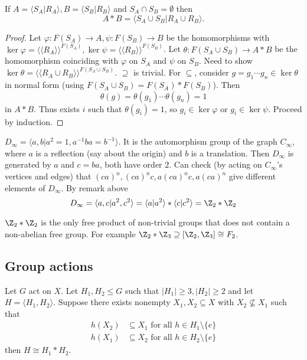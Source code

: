 \documentclass[a4paper]{article}
\begin{document}
\begin{theorem}
  If \(A = \langle S_A|R_A \rangle, B = \langle S_B|R_B \rangle\) and \(S_A \cap S_B = \emptyset\) then
  \[
    A * B = \langle S_A \cup S_B| R_A \cup R_B \rangle.
  \]
\end{theorem}

\begin{proof}
  Let \(\varphi: F(S_A) \to A, \psi: F(S_B) \to B\) be the homomorphisms with \(\ker \varphi = \langle\langle R_A \rangle\rangle^{F(S_A)}, \ker \psi = \langle\langle R_B \rangle\rangle^{F(S_B)}\). Let \(\theta: F(S_A \cup S_B) \to A * B\) be the homomorphism coinciding with \(\varphi\) on \(S_A\) and \(\psi\) on \(S_B\). Need to show \(\ker \theta = \langle\langle R_A \cup R_B \rangle\rangle^{F(S_A \cup S_B)}\). \(\supseteq\) is trivial. For \(\subseteq\), consider \(g = g_1 \cdots g_n \in \ker \theta\) in normal form (using \(F(S_A \cup S_B) = F(S_A) * F(S_B)\)). Then
  \[
    \theta(g) = \theta(g_1) \cdots \theta(g_n) = 1
  \]
  in \(A * B\). Thus exists \(i\) such that \(\theta(g_i) = 1\), so \(g_i \in \ker \varphi\) or \(g_i \in \ker \psi\). Proceed by induction.
\end{proof}

\begin{eg}
  \(D_\infty = \langle a, b| a^2 = 1, a^{-1}ba = b^{-1} \rangle\). It is the automorphism group of the graph \(C_\infty\), where \(a\) is a reflection (say about the origin) and \(b\) is a translation. Then \(D_\infty\) is generated by \(a\) and \(c = ba\), both have order \(2\). Can check (by acting on \(C_\infty\)'s vertices and edges) that \((ca)^n, (ca)^n c, a(ca)^n c, a (ca)^n\) give different elements of \(D_\infty\). By remark above
  \[
    D_\infty
    = \langle a, c| a^2, c^2\rangle
    = \langle a|a^2 \rangle * \langle c|c^2 \rangle
    = \Z_2 * \Z_2
  \]
\end{eg}

\begin{remark}
  \(\Z_2 * \Z_2\) is the only free product of non-trivial groups that does not contain a non-abelian free group. For example \(\Z_2 * \Z_3 \supseteq [\Z_2, \Z_3] \cong F_2\).
\end{remark}

\subsection{Group actions}

\begin{theorem}
  Let \(G\) act on \(X\). Let \(H_1, H_2 \leq G\) such that \(|H_1| \geq 3, |H_2| \geq 2\) and let \(H = \langle H_1, H_2 \rangle\). Suppose there exists nonempty \(X_1, X_2 \subseteq X\) with \(X_2 \nsubseteq X_1\) such that
  \begin{align*}
    h(X_2) &\subseteq X_1 \text{ for all } h \in H_1 \setminus \{e\} \\
    h(X_1) &\subseteq X_2 \text{ for all } h \in H_2 \setminus \{e\}
  \end{align*}
  then \(H \cong H_1 * H_2\).
\end{theorem}
\end{document}
